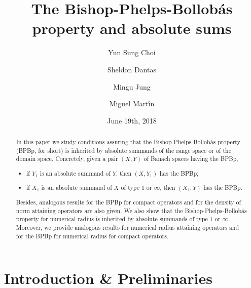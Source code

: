 \documentclass[10pt,a4paper]{amsart}
\title{The Bishop-Phelps-Bollob\'as property and absolute sums}
\author[Choi]{Yun Sung Choi}
\author[Dantas]{Sheldon Dantas}
\author[Jung]{Mingu Jung}
\author[Mart\'{\i}n]{Miguel Mart\'{\i}n}
\date{June 19th, 2018}
\theoremstyle{plain}
\theoremstyle{definition}
\begin{document}
	
\begin{abstract}
In this paper we study conditions assuring that the Bishop-Phelps-Bollob\'{a}s property (BPBp, for short) is inherited by absolute summands of the range space or of the domain space. Concretely, given a pair $(X,Y)$ of Banach spaces having the BPBp,
\begin{itemize}
\item[(a)] if $Y_1$ is an absolute summand of $Y$, then $(X,Y_1)$ has the BPBp;
\item[(b)] if $X_1$ is an absolute summand of $X$ of type $1$ or $\infty$, then $(X_1,Y)$ has the BPBp.
\end{itemize}
Besides, analogous results for the BPBp for compact operators and for the density of norm attaining operators are also given. We also show that the Bishop-Phelps-Bollob\'{a}s property for numerical radius is inherited by absolute summands of type $1$ or $\infty$. Moreover, we provide analogous results for numerical radius attaining operators and for the BPBp for numerical radius for compact operators.
\end{abstract}

\maketitle

\section{Introduction \& Preliminaries}
\end{document}
